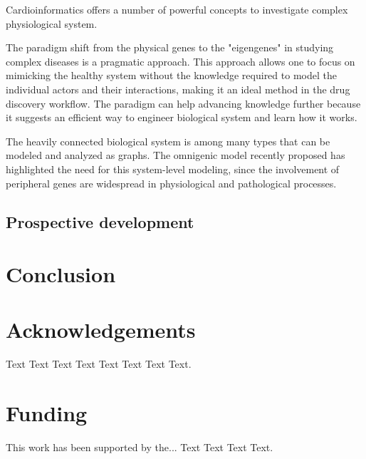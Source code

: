 \documentclass[letter]{bioinfo}
\begin{document}
Cardioinformatics offers a number of powerful concepts to investigate complex physiological system.

The paradigm shift from the physical genes to the "eigengenes" in studying complex diseases \citep{Weiss:2012:Good} is a pragmatic approach. This approach allows one to focus on mimicking the healthy system without the knowledge required to model the individual actors and their interactions, making it an ideal method in the drug discovery workflow. The paradigm can help advancing knowledge further because it suggests an efficient way to engineer biological system and learn how it works.

The heavily connected biological system is among many types that can be modeled and analyzed as graphs. The omnigenic model recently proposed has highlighted the need for this system-level modeling, since the involvement of peripheral genes are widespread in physiological and pathological processes.

\subsection{Prospective development}



\section{Conclusion}


%

\enlargethispage{12pt}




\section*{Acknowledgements}

Text Text Text Text Text Text  Text Text.  
\vspace*{-12pt}

\section*{Funding}

This work has been supported by the... Text Text  Text Text.\vspace*{-12pt}


%
%
%
%
%
%

\end{document}
